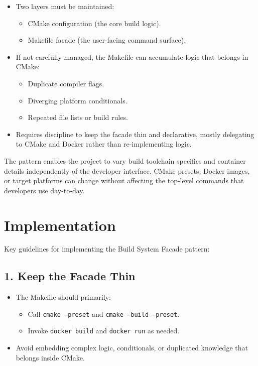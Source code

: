 \documentclass[11pt]{article}
\begin{document}
\begin{itemize}[noitemsep]
  \item Two layers must be maintained:
    \begin{itemize}[noitemsep]
      \item CMake configuration (the core build logic).
      \item Makefile facade (the user-facing command surface).
    \end{itemize}
  \item If not carefully managed, the Makefile can accumulate logic that belongs in CMake:
    \begin{itemize}[noitemsep]
      \item Duplicate compiler flags.
      \item Diverging platform conditionals.
      \item Repeated file lists or build rules.
    \end{itemize}
  \item Requires discipline to keep the facade thin and declarative, mostly delegating to CMake and Docker rather than re-implementing logic.
\end{itemize}

The pattern enables the project to vary build toolchain specifics and container details independently of the developer interface. CMake presets, Docker images, or target platforms can change without affecting the top-level commands that developers use day-to-day.

\section{Implementation}

Key guidelines for implementing the Build System Facade pattern:

\subsection*{1. Keep the Facade Thin}

\begin{itemize}[noitemsep]
  \item The Makefile should primarily:
    \begin{itemize}[noitemsep]
      \item Call \texttt{cmake --preset} and \texttt{cmake --build --preset}.
      \item Invoke \texttt{docker build} and \texttt{docker run} as needed.
    \end{itemize}
  \item Avoid embedding complex logic, conditionals, or duplicated knowledge that belongs inside CMake.
\end{itemize}
\end{document}
